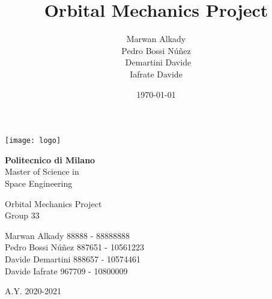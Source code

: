 \documentclass[11pt,a4paper]{report}
\title{Orbital Mechanics Project}
\author{Marwan Alkady\\ Pedro Bossi N\'{u}\~{n}ez \\\ Demartini Davide\\ Iafrate Davide\\}
\date{\today}
\begin{document}
\begin{titlepage}
	\clearpage\thispagestyle{empty}
	\centering


   \centering \texttt{[image: logo]}

   \vspace{0.5cm}

	{\Huge\textbf{Politecnico di Milano} \\
Master of Science in\\ Space Engineering \\
		 \par}
		\vspace{3cm}
	{\Huge{Orbital Mechanics Project}} \\
	\vspace{3cm}
	{\huge Group 33\\}
	\vspace{0.4cm}
	{\LARGE Marwan Alkady 88888 - 88888888\\ Pedro Bossi N\'{u}\~{n}ez 887651 - 10561223\\ Davide Demartini 888657 - 10574461\\ Davide Iafrate 967709 - 10800009\\ \par}

\vspace{1cm}
	{\Large A.Y. 2020-2021 \par}

	\pagebreak

\end{titlepage}

{}
\end{document}
